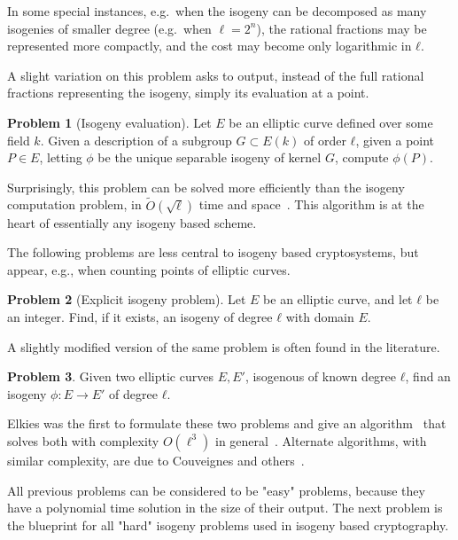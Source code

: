 \documentclass[10pt]{article}
\theoremstyle{plain}
\theoremstyle{definition}
\newtheorem{problem}{Problem}
\def\tildO{\ensuremath{\tilde{O}}}
\begin{document}
In some special instances, e.g.\ when the isogeny can be decomposed as
many isogenies of smaller degree (e.g.\ when $\ell = 2^n$), the
rational fractions may be represented more compactly, and the cost may
become only logarithmic in $ℓ$.

A slight variation on this problem asks to output, instead of the full
rational fractions representing the isogeny, simply its evaluation at
a point.

\begin{problem}[Isogeny evaluation]
  Let $E$ be an elliptic curve defined over some field $k$. %
  Given a description of a subgroup $G⊂E(k)$ of order $ℓ$, given a
  point $P∈E$, letting $ϕ$ be the unique separable isogeny of kernel
  $G$, compute $ϕ(P)$.
\end{problem}

Surprisingly, this problem can be solved more efficiently than the
isogeny computation problem, in $\tildO(\sqrt{ℓ})$ time and
space~\cite{bernstein2020faster}. %
This algorithm is at the heart of essentially any isogeny based
scheme.

The following problems are less central to isogeny based
cryptosystems, but appear, e.g., when counting points of elliptic
curves.

\begin{problem}[Explicit isogeny problem]
  \label{prob:expl-isog}
  Let $E$ be an elliptic curve, and let $ℓ$ be an integer. %
  Find, if it exists, an isogeny of degree $ℓ$ with domain $E$.
\end{problem}

A slightly modified version of the same problem is often found in the
literature.

\begin{problem}
  Given two elliptic curves $E,E'$, isogenous of known degree $ℓ$,
  find an isogeny $ϕ:E\to E'$ of degree $ℓ$.
\end{problem}

Elkies was the first to formulate these two problems and give an
algorithm~\cite{elkies92,elkies98} that solves both with complexity
$O(\ell^3)$ in
general~\cite{bostan+morain+salvy+schost08,lercier+sirvent08}. %
Alternate algorithms, with similar complexity, are due to Couveignes
and
others~\cite{couveignes94,couveignes96,couveignes00,df+schost09,defeo2016explicit}.

All previous problems can be considered to be "easy" problems,
because they have a polynomial time solution in the size of their
output. %
The next problem is the blueprint for all "hard" isogeny problems used in
isogeny based cryptography. %
\end{document}
